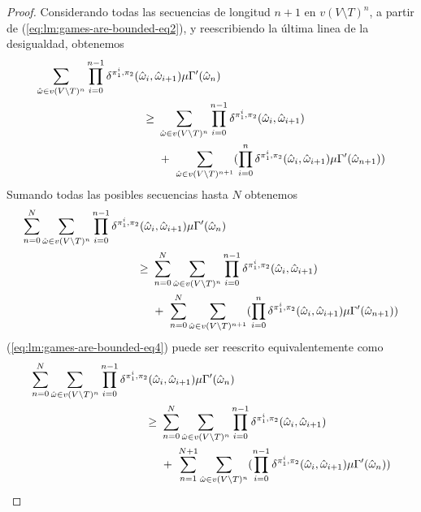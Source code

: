 \begin{proof}
  Considerando todas las secuencias de longitud $n+1$ en $v(V \setminus T)^n$,
  a partir de (\ref{eq:lm:games-are-bounded-eq2}), y reescribiendo la última linea de la desigualdad, obtenemos
  \begin{align}
    \sum_{\hat{\omega} \in v(V \setminus T)^n}\prod^{n-1}_{i=0} \delta^{\strat{1}^i, \strat{2}}(\hat{\omega}_i, \hat{\omega}_{i+1}) \mu \Gamma'(\hat{\omega}_n)  \hspace{-5.5em}& \notag\\
    \geq \ & \sum_{\hat{\omega} \in v(V \setminus T)^n}\prod^{n-1}_{i=0} \delta^{\strat{1}^i, \strat{2}}(\hat{\omega}_i, \hat{\omega}_{i+1}) \label{eq:lm:games-are-bounded-eq3}\\
    & + \ \sum_{\hat{\omega} \in v(V \setminus T)^{n+1}}(\prod^{n}_{i=0} \delta^{\strat{1}^i, \strat{2}}(\hat{\omega}_i, \hat{\omega}_{i+1}) \mu \Gamma'(\hat{\omega}_{n+1})) \notag
  \end{align}
  Sumando todas las posibles secuencias hasta $N$ obtenemos
  \begin{align}
    \sum^{N}_{n=0}\sum_{\hat{\omega} \in v(V \setminus T)^n}\prod^{n-1}_{i=0} \delta^{\strat{1}^i, \strat{2}}(\hat{\omega}_i, \hat{\omega}_{i+1}) \mu \Gamma'(\hat{\omega}_n)   \hspace{-6.5em}& \notag\\
    \geq \ & \sum^{N}_{n=0} \sum_{\hat{\omega} \in v(V \setminus T)^n}\prod^{n-1}_{i=0} \delta^{\strat{1}^i, \strat{2}}(\hat{\omega}_i, \hat{\omega}_{i+1}) \label{eq:lm:games-are-bounded-eq4} \\
    & + \ \sum^{N}_{n=0} \sum_{\hat{\omega} \in v(V \setminus T)^{n+1}}(\prod^{n}_{i=0} \delta^{\strat{1}^i, \strat{2}}(\hat{\omega}_i, \hat{\omega}_{i+1}) \mu \Gamma'(\hat{\omega}_{n+1})) \notag
  \end{align}
  (\ref{eq:lm:games-are-bounded-eq4}) puede ser reescrito equivalentemente como
  \begin{align}
    \sum^{N}_{n=0}\sum_{\hat{\omega} \in v(V \setminus T)^n}\prod^{n-1}_{i=0} \delta^{\strat{1}^i, \strat{2}}(\hat{\omega}_i, \hat{\omega}_{i+1}) \mu \Gamma'(\hat{\omega}_n)  \hspace{-6.5em}& \notag\\
    \geq \ & \sum^{N}_{n=0} \sum_{\hat{\omega} \in v(V \setminus T)^n}\prod^{n-1}_{i=0} \delta^{\strat{1}^i, \strat{2}}(\hat{\omega}_i, \hat{\omega}_{i+1}) \label{eq:lm:games-are-bounded-eq5}\\
    & + \ \sum^{N+1}_{n=1} \sum_{\hat{\omega} \in v(V \setminus T)^{n}}(\prod^{n-1}_{i=0} \delta^{\strat{1}^i, \strat{2}}(\hat{\omega}_i, \hat{\omega}_{i+1}) \mu \Gamma'(\hat{\omega}_{n})) \notag

\end{align}
\end{proof}
